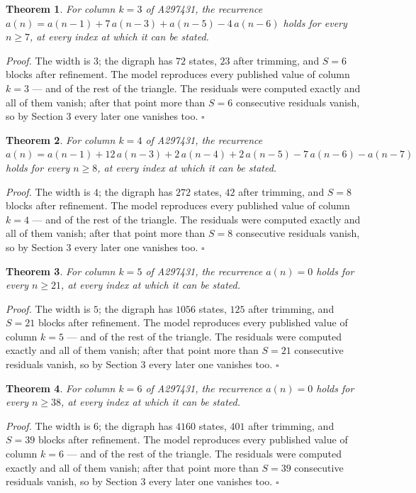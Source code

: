 \documentclass[11pt]{article}
\newtheorem{theorem}{Theorem}
\theoremstyle{definition}
\begin{document}
\begin{theorem} For column $k = 3$ of A297431, the recurrence $a(n) = a(n-1) + 7\,a(n-3) + a(n-5) - 4\,a(n-6)$ holds for every $n \ge 7$, at every index at which it can be stated.\end{theorem}

{\itshape Proof.} The width is $3$; the digraph has $72$ states, $23$ after trimming, and $S = 6$ blocks after refinement. The model reproduces every published value of column $k = 3$ --- and of the rest of the triangle. The residuals were computed exactly and all of them vanish; after that point more than $S = 6$ consecutive residuals vanish, so by Section 3 every later one vanishes too. $\square$

\begin{theorem} For column $k = 4$ of A297431, the recurrence $a(n) = a(n-1) + 12\,a(n-3) + 2\,a(n-4) + 2\,a(n-5) - 7\,a(n-6) - a(n-7)$ holds for every $n \ge 8$, at every index at which it can be stated.\end{theorem}

{\itshape Proof.} The width is $4$; the digraph has $272$ states, $42$ after trimming, and $S = 8$ blocks after refinement. The model reproduces every published value of column $k = 4$ --- and of the rest of the triangle. The residuals were computed exactly and all of them vanish; after that point more than $S = 8$ consecutive residuals vanish, so by Section 3 every later one vanishes too. $\square$

\begin{theorem} For column $k = 5$ of A297431, the recurrence $a(n) = 0$ holds for every $n \ge 21$, at every index at which it can be stated.\end{theorem}

{\itshape Proof.} The width is $5$; the digraph has $1056$ states, $125$ after trimming, and $S = 21$ blocks after refinement. The model reproduces every published value of column $k = 5$ --- and of the rest of the triangle. The residuals were computed exactly and all of them vanish; after that point more than $S = 21$ consecutive residuals vanish, so by Section 3 every later one vanishes too. $\square$

\begin{theorem} For column $k = 6$ of A297431, the recurrence $a(n) = 0$ holds for every $n \ge 38$, at every index at which it can be stated.\end{theorem}

{\itshape Proof.} The width is $6$; the digraph has $4160$ states, $401$ after trimming, and $S = 39$ blocks after refinement. The model reproduces every published value of column $k = 6$ --- and of the rest of the triangle. The residuals were computed exactly and all of them vanish; after that point more than $S = 39$ consecutive residuals vanish, so by Section 3 every later one vanishes too. $\square$
\end{document}
